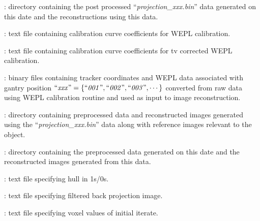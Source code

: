 \documentclass[landscape,12pt]{article}
\begin{document}
\begin{myEnumerate}[labelindent=1pt, leftmargin=*]
\begin{myEnumerate}[labelindent=1pt, leftmargin=*]
\begin{myEnumerate}[labelindent=1pt, leftmargin=*]
\begin{myEnumerate}[labelindent=1pt, leftmargin=*]
\begin{myEnumerate}[labelindent=1pt, leftmargin=*]
                        \begin{myEnumerate}[labelindent=1pt, leftmargin=*]
                            \item {} \color{Black}: directory containing the post processed ``\textit{projection\_xxx.bin}'' data generated on this date and the reconstructions using this data.
                            \begin{myEnumerate}[labelindent=1pt, leftmargin=*]
                                \item {} \color{Black}: text file containing calibration curve coefficients for WEPL calibration.
                                \item {} \color{Black}: text file containing calibration curve coefficients for tv corrected WEPL calibration.
                                \item {} \color{Black}: binary files containing tracker coordinates and WEPL data associated with gantry position $\textrm{``\textit{xxx}''} =\{\textrm{``\textit{001}''}, \textrm{``\textit{002}''}, \textrm{``\textit{003}''}, \cdots\}$ converted from raw data using WEPL calibration routine and used as input to image reconstruction.
                                \item {} \color{Black}: directory containing preprocessed data and reconstructed images generated using the ``\textit{projection\_xxx.bin}'' data along with reference images relevant to the object.
                                \begin{myEnumerate}[labelindent=1pt, leftmargin=*]
                                    \item {} \color{Black}: directory containing the preprocessed data generated on this date and the reconstructed images generated from this data.
                                    \begin{myEnumerate}[labelindent=1pt, leftmargin=*]
                                        \item {} \color{Black}: text file specifying hull in 1s/0s.
                                        \item {} \color{Black}: text file specifying filtered back projection image.
                                        \item {} \color{Black}: text file specifying voxel values of initial iterate.

\end{myEnumerate}
\end{myEnumerate}
\end{myEnumerate}
\end{myEnumerate}
\end{myEnumerate}
\end{myEnumerate}
\end{myEnumerate}
\end{myEnumerate}
\end{myEnumerate}
\end{document}
